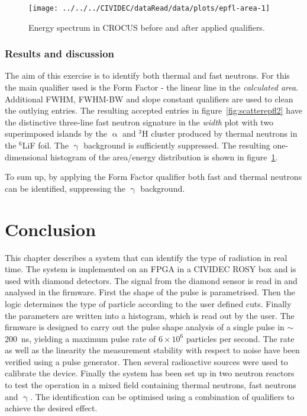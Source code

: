 \clearpage
\begin{figure}[!t]
\centering
\texttt{[image: ../../../CIVIDEC/dataRead/data/plots/epfl-area-1]}
\caption{Energy spectrum in CROCUS before and after applied qualifiers.}
\label{fig:scatterepfl2area}
\end{figure}


\subsubsection{Results and discussion}
The aim of this exercise is to identify both thermal and fast neutrons. For this the main qualifier used is the Form Factor - the linear line in the \emph{calculated area}. Additional FWHM, FWHM-BW and slope constant qualifiers are used to clean the outlying entries. The resulting accepted entries in figure~\ref{fig:scatterepfl2} have the distinctive three-line fast neutron signature in the \emph{width} plot with two superimposed islands by the $\upalpha$ and $^3$H cluster produced by thermal neutrons in the $^6$LiF foil. The $\upgamma$ background is sufficiently suppressed. The resulting one-dimensional histogram of the area/energy distribution is shown in figure~\ref{fig:scatterepfl2area}.

To sum up, by applying the Form Factor qualifier both fast and thermal neutrons can be identified, suppressing the $\upgamma$ background.



\clearpage
\section{Conclusion}
\label{sec:conclcurrent}
This chapter describes a system that can identify the type of radiation in real time. The system is implemented on an FPGA in a CIVIDEC ROSY box and is used with diamond detectors. The signal from the diamond sensor is read in and analysed in the firmware. First the shape of the pulse is parametrised. Then the logic determines the type of particle according to the user defined cuts. Finally the parameters are written into a histogram, which is read out by the user. The firmware is designed to carry out the pulse shape analysis of a single pulse in $\sim$200~ns, yielding a maximum pulse rate of $6\times10^6$ particles per second. The rate as well as the linearity the measurement stability with respect to noise have been verified using a pulse generator. Then several radioactive sources were used to calibrate the device. Finally the system has been set up in two neutron reactors to test the operation in a mixed field containing thermal neutrons, fast neutrons and $\upgamma$. The identification can be optimised using a combination of qualifiers to achieve the desired effect.


